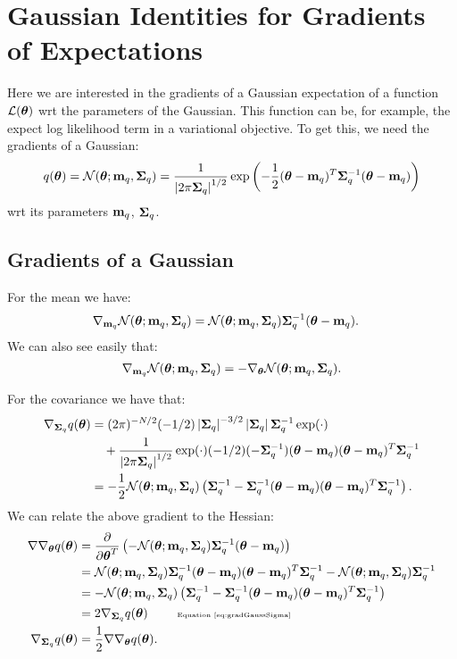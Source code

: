 \appendix
\section{Gaussian Identities for Gradients of Expectations \label{sec:expgrad}}
Here we are interested in the gradients of a Gaussian expectation of a function $\mathcal{L}(\boldsymbol{ \theta })$ wrt the parameters of the Gaussian. This function can be, for example, the expect log likelihood term in a variational objective. 
To get this, we need the gradients of a Gaussian:
\begin{equation}
	q(\boldsymbol{ \theta }) = \mathcal{N}(\boldsymbol{ \theta }; \mathbf{m}_{q}, \mathbf{\Sigma}_{q}) = \frac{1}{\left\lvert2\pi\mathbf{\Sigma}_{q}\right\rvert^{1/2}} \exp \left(- \frac{1}{2}(\boldsymbol{ \theta }-\mathbf{m}_{q})^{T}\mathbf{\Sigma}_{q}^{-1}(\boldsymbol{ \theta }-\mathbf{m}_{q}) \right) 
\end{equation}
wrt its parameters $\mathbf{m}_{q}$, $\mathbf{\Sigma}_{q}$. 
%
\subsection{Gradients of a Gaussian}
%
For the mean we have:
\begin{align}
	\nabla_{\mathbf{m}_{q}} \mathcal{N}(\boldsymbol{ \theta }; \mathbf{m}_{q}, \mathbf{\Sigma}_{q}) 
	& = \mathcal{N}(\boldsymbol{ \theta }; \mathbf{m}_{q}, \mathbf{\Sigma}_{q})  \mathbf{\Sigma}_{q}^{-1} (\boldsymbol{ \theta } - \mathbf{m}_{q}) \text{.} 
\end{align}
We can also see easily that:
\begin{align}
	\nabla_{\mathbf{m}_{q}} \mathcal{N}(\boldsymbol{ \theta }; \mathbf{m}_{q}, \mathbf{\Sigma}_{q})  = - \nabla_{\boldsymbol{ \theta }} \mathcal{N}(\boldsymbol{ \theta }; \mathbf{m}_{q}, \mathbf{\Sigma}_{q})  \text{.} 
\end{align}

%
For the covariance we have that:
\begin{align}
	\gradient_{\Sigmaq} q(\vectheta) &= (2\pi)^{-N/2} (-1/2) \det{\Sigmaq}^{-3/2} \det{\Sigmaq} \Sigmaq^{-1} \exp(\cdot)  \\
	& \quad + \frac{1}{\det{2 \pi \Sigmaq}^{1/2}} \exp(\cdot) (-1/2) (-\Sigmaq^{-1})(\vectheta-\mq)(\vectheta-\mq)^{T} \Sigmaq^{-1} \\
	\label{eq:gradGaussSigma}
	&= - \frac{1}{2} \Normal(\vectheta; \mq, \Sigmaq) \left( \Sigmaq^{-1}  - \Sigmaq^{-1} (\vectheta - \mq) (\vectheta-\mq)^{T} \Sigmaq^{-1}\right) \text{.}
\end{align}
We can relate the above gradient to the Hessian:
\begin{align}
	\hessian_{\vectheta} q(\vectheta)
	& = \deriv{}{\vectheta^{T}} \left(- \Normal(\vectheta; \mq, \Sigmaq) \Sigmaq^{-1} (\vectheta - \mq) \right) \\
	& =  \Normal(\vectheta; \mq, \Sigmaq)  \Sigmaq^{-1} (\vectheta - \mq) (\vectheta - \mq)^{T} \Sigmaq^{-1} -  \Normal(\vectheta; \mq, \Sigmaq) \Sigmaq^{-1}\\
	& = -  \Normal(\vectheta; \mq, \Sigmaq)  \left(  \Sigmaq^{-1}  -    \Sigmaq^{-1} (\vectheta - \mq) (\vectheta - \mq)^{T} \Sigmaq^{-1}  \right)\\
	& = 2 \gradient_{\Sigmaq} q(\vectheta)      \qquad  \text{  \tiny{Equation \eqref{eq:gradGaussSigma}} } \\
	\label{eq:gradtohess}
	\gradient_{\Sigmaq} q(\vectheta) & = \frac{1}{2} \hessian_{\vectheta}  q(\vectheta) \text{.}
\end{align}
%
